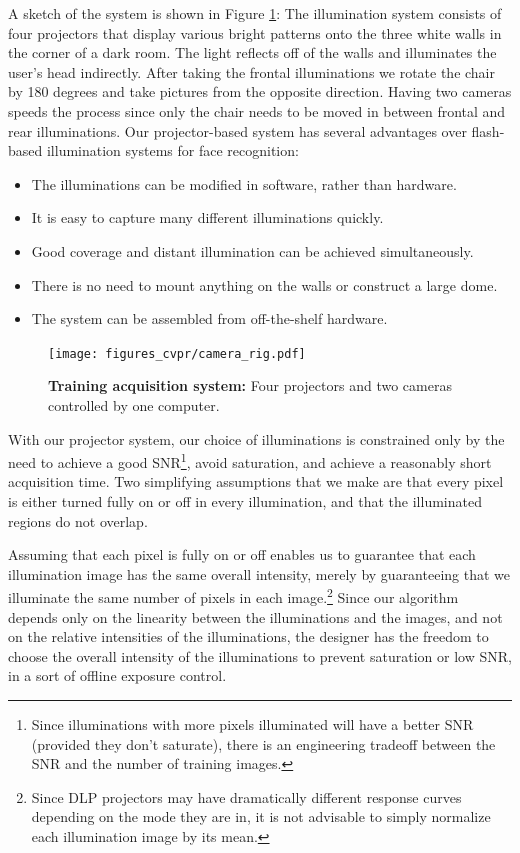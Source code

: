 \documentclass[12pt,journal,draftcls,letterpaper,onecolumn]{IEEEtran}
\begin{document}
A sketch of the
system is shown in Figure \ref{fig:system}: The illumination
system consists of four projectors that display various bright
patterns onto the three white walls in the corner of a dark
room.  The light reflects off of the walls and illuminates the
user's head indirectly.  After taking the frontal illuminations
we rotate the chair by 180 degrees and take pictures from the
opposite direction.  Having two cameras speeds the process
since only the chair needs to be moved in between frontal and
rear illuminations. Our projector-based system has several
advantages over flash-based illumination systems for face recognition:
\begin{itemize}
\item The illuminations can be modified in software, rather than hardware.
\item It is easy to capture many different illuminations quickly.
\item Good coverage and distant illumination can be achieved simultaneously.
\item There is no need to mount anything on the walls or construct a large dome.
\item The system can be assembled from off-the-shelf hardware.
\end{itemize}
\begin{figure}
\centerline{\hspace{-0.1in}\texttt{[image: figures\_cvpr/camera\_rig.pdf]}}
\caption{{\bf Training acquisition system:} Four projectors and two cameras controlled by one computer.}
\vspace{-.5in}
\label{fig:system}
\end{figure}
With our projector system, our choice of illuminations is
constrained only by the need to achieve a good
SNR\footnote{Since illuminations with more pixels illuminated
will have a better SNR (provided they don't saturate), there is
an engineering tradeoff between the SNR and the number of
training images.}, avoid saturation, and achieve
a reasonably short acquisition time.  Two simplifying
assumptions that we make are that every pixel is either turned
fully on or off in every illumination, and that the illuminated
regions do not overlap.

Assuming that each pixel is fully on or off enables us to guarantee
that each illumination image has the same overall intensity, merely
by guaranteeing that we illuminate the same number of pixels in each image.\footnote{Since DLP projectors may have dramatically different response
curves depending on the mode they are in, it is not advisable to simply normalize each illumination image by its mean.}
Since our algorithm depends only on  the
linearity between the illuminations and the images, and not on the
relative intensities of the illuminations, the designer has the freedom to choose the overall intensity of the illuminations
to prevent saturation or low SNR, in a sort of offline exposure control.
\end{document}
